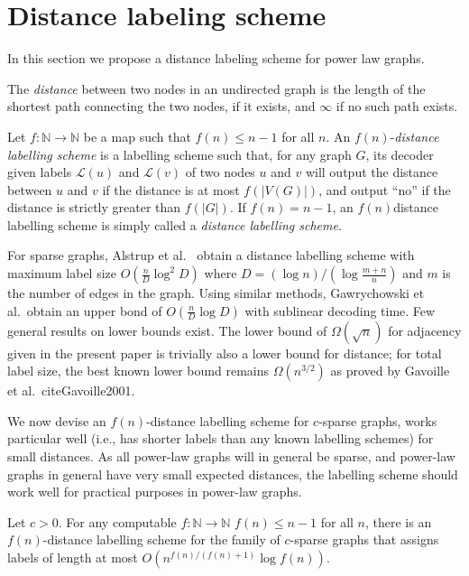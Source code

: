 \section{Distance labeling scheme}\label{Sec:Distance}
In this section we propose a distance labeling scheme for power law graphs. 

The \emph{distance} between two nodes in an undirected graph is the length of the shortest path connecting
the two nodes, if it exists, and $\infty$ if no such path exists.

Let $f : \mathbb{N} \longrightarrow \mathbb{N}$ be a map such that
$f(n) \leq  n -1$ for all $n$. An $f(n)$-\emph{distance labelling scheme} is a labelling
scheme such that, for any graph $G$, its decoder given labels $\mathcal{L}(u)$ and $\mathcal{L}(v)$ of two nodes $u$ and $v$
will output the distance between $u$ and $v$ if the distance is at most $f(\vert V(G) \vert)$, and output ``no'' if the distance
is  strictly greater than $f(\vert G \vert)$. If $f(n) = n-1$,
an $f(n)$distance labelling scheme is simply called a \emph{distance labelling scheme}.

For sparse graphs,
Alstrup et al.\ \cite{DBLP:journals/corr/AlstrupDKP15} obtain a distance labelling scheme with maximum label size
$O(\frac{n}{D} \log^2 D)$ where $D = (\log n)/(\log \frac{m+n}{n})$ and $m$ is the number of edges
in the graph.  Using similar methods, Gawrychowski et al.\ obtain an upper bond of \cite{DBLP:journals/corr/GawrychowskiKU15}
$O(\frac{n}{D} \log D)$ with sublinear decoding time. Few general results on lower bounds exist. The lower bound of $\Omega(\sqrt{n})$ for adjacency given in the present paper is trivially also a lower bound for distance; for total label size, the best known lower bound remains $\Omega(n^{3/2})$ as proved by Gavoille et al.\ cite{Gavoille2001}.

We now devise an $f(n)$-distance labelling scheme for $c$-sparse graphs,
works particular well (i.e., has shorter labels than any known labelling schemes) for small distances. As
all power-law graphs will in general be sparse, and power-law graphs in general
have very small expected distances, the labelling scheme should work well for practical purposes in power-law graphs.

\begin{lemma}\label{lem:sparse_small_dist}
Let $c > 0$. For any computable $f : \mathbb{N} \longrightarrow \mathbb{N}$ 
$f(n) \leq n -1$ for all $n$, there is an $f(n)$-distance labelling scheme for the family of $c$-sparse graphs
that assigns labels of length at most $O(n^{f(n)/(f(n) + 1)} \log f(n))$.
\end{lemma}

